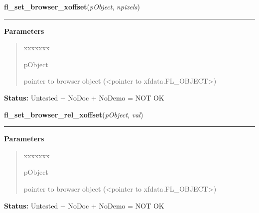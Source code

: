 \hspace{.8\funcindent}\begin{boxedminipage}{\funcwidth}

    \raggedright \textbf{fl\_set\_browser\_xoffset}(\textit{pObject}, \textit{npixels})

    \vspace{-1.5ex}

    \rule{\textwidth}{0.5\fboxrule}
\setlength{\parskip}{2ex}
\setlength{\parskip}{1ex}
      \textbf{Parameters}
      \vspace{-1ex}

      \begin{quote}
        \begin{Ventry}{xxxxxxx}

          \item[pObject]

          pointer to browser object ({\textless}pointer to 
          xfdata.FL\_OBJECT{\textgreater})

        \end{Ventry}

      \end{quote}

\textbf{Status:} Untested + NoDoc + NoDemo = NOT OK



    \end{boxedminipage}

    \label{xformslib:library:fl_set_browser_rel_xoffset}

    \vspace{0.5ex}

\hspace{.8\funcindent}\begin{boxedminipage}{\funcwidth}

    \raggedright \textbf{fl\_set\_browser\_rel\_xoffset}(\textit{pObject}, \textit{val})

    \vspace{-1.5ex}

    \rule{\textwidth}{0.5\fboxrule}
\setlength{\parskip}{2ex}
\setlength{\parskip}{1ex}
      \textbf{Parameters}
      \vspace{-1ex}

      \begin{quote}
        \begin{Ventry}{xxxxxxx}

          \item[pObject]

          pointer to browser object ({\textless}pointer to 
          xfdata.FL\_OBJECT{\textgreater})

        \end{Ventry}

      \end{quote}

\textbf{Status:} Untested + NoDoc + NoDemo = NOT OK



    \end{boxedminipage}

